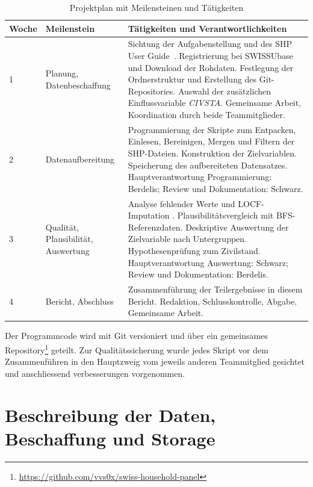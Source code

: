\begin{table}[h]
\centering
\caption{Projektplan mit Meilensteinen und Tätigkeiten}
\label{tab:projektplan}
\begin{tabularx}{\textwidth}{p{1cm}p{2.8cm}X}
\toprule
Woche & Meilenstein & Tätigkeiten und Verantwortlichkeiten \\
\midrule
1 & Planung, Daten\-beschaffung &
Sichtung der Aufgabenstellung und des SHP User Guide~\cite{Voorpostel2018}.
Registrierung bei SWISSUbase und Download der Rohdaten.
Festlegung der Ordnerstruktur und Erstellung des Git-Repositories.
Auswahl der zusätzlichen Einflussvariable \emph{CIVSTA}.
Gemeinsame Arbeit, Koordination durch beide Teammitglieder. \\
\midrule
2 & Daten\-aufbereitung &
Programmierung der Skripte zum Entpacken, Einlesen, Bereinigen, Mergen und Filtern der SHP-Dateien.
Konstruktion der Zielvariablen.
Speicherung des aufbereiteten Datensatzes.
Hauptverantwortung Programmierung: Berdelis; Review und Dokumentation: Schwarz. \\
\midrule
3 & Qualität, Plausibilität, Auswertung &
Analyse fehlender Werte und LOCF-Imputation \footnotemark.
Plausibilitätsvergleich mit BFS-Referenzdaten.
Deskriptive Auswertung der Zielvariable nach Untergruppen.
Hypothesenprüfung zum Zivilstand.
Hauptverantwortung Auswertung: Schwarz; Review und Dokumentation: Berdelis. \\
\midrule
4 & Bericht, \newline Abschluss &
Zusammenführung der Teilergebnisse in diesem Bericht.
Redaktion, Schlusskontrolle, Abgabe.
Gemeinsame Arbeit. \\
\bottomrule
\end{tabularx}
\end{table}
Der Programmcode wird mit Git versioniert und über ein gemeinsames Repository\footnote{\href{https://github.com/vvs0x/swiss-household-panel}{https://github.com/vvs0x/swiss-household-panel}} geteilt. Zur Qualitätssicherung
wurde jedes Skript vor dem Zusammenführen in den Hauptzweig vom jeweils anderen
Teammitglied gesichtet und anschliessend verbesserungen vorgenommen.

\newpage
\section{Beschreibung der Daten, Beschaffung und Storage}
\label{sec:daten}

